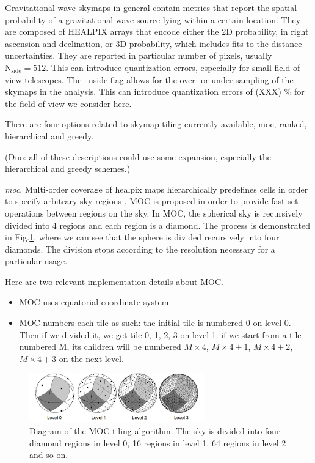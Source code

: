 \documentclass[twocolumn]{aastex61}
\newcommand{\rednote}[1]{{\color{red} (#1)}}
\begin{document}
Gravitational-wave skymaps in general contain metrics that report the spatial probability of a gravitational-wave source lying within a certain location.
They are composed of HEALPIX arrays that encode either the 2D probability, in right ascension and declination, or 3D probability, which includes fits to the distance uncertainties.
They are reported in particular number of pixels, usually $\textrm{N}_\textrm{side} = 512$. 
This can introduce quantization errors, especially for small field-of-view telescopes. 
The --nside flag allows for the over- or under-sampling of the skymaps in the analysis.
This can introduce quantization errors of \rednote{XXX} \% for the field-of-view we consider here.

There are four options related to skymap tiling currently available, moc, ranked, hierarchical and greedy.

\rednote{Duo: all of these descriptions could use some expansion, especially the hierarchical and greedy schemes.}

\emph{moc}. Multi-order coverage of healpix maps hierarchically predefines cells in order to specify arbitrary sky regions \citep{FeBo2014}. MOC is proposed in order to provide fast set operations between regions on the sky. In MOC, the spherical sky is recursively divided into 4 regions and each region is a diamond. The process is demonstrated in Fig.\ref{fig:tiling_moc_demo}, where we can see that the sphere is divided recursively into four diamonds. The division stops according to the resolution necessary for a particular usage.

Here are two relevant implementation details about MOC.
\begin{itemize}
\item MOC uses equatorial coordinate system. 
\item MOC numbers each tile as such: the initial tile is numbered 0 on level 0. Then if we divided it, we get tile 0, 1, 2, 3 on level 1. if we start from a tile numbered M, its children will be numbered $M\times 4$, $M\times 4 + 1$, $M\times 4 + 2$,$M\times 4 + 3$ on the next level.
\end{itemize}
\begin{figure}[t]
\hspace*{-0.5cm}
\centering
\includegraphics[width=3in]{tiling_moc_demo.png}
\caption{Diagram of the MOC tiling algorithm. The sky is divided into four diamond regions in level 0, 16 regions in level 1, 64 regions in level 2 and so on.}
 \label{fig:tiling_moc_demo}
 \end{figure}
\end{document}
